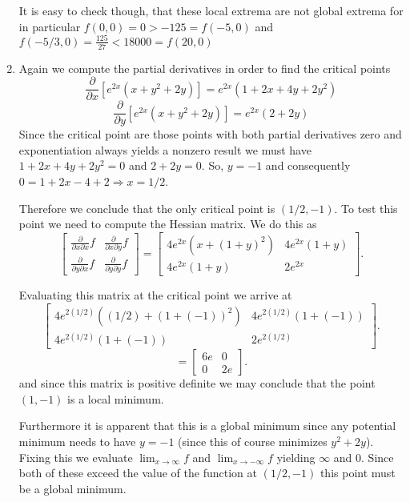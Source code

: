 \documentclass[12pt]{article}
\begin{document}
\begin{enumerate}
It is easy to check though, that these local extrema are not global extrema for in particular $f(0,0)=0>-125=f(-5,0)$ and $f(-5/3,0)=\frac{125}{27}<18000=f(20,0)$

\item Again we compute the partial derivatives in order to find the critical points
\[\frac{\partial}{\partial x} \left[ e^{2x}(x+y^2+2y) \right]=e^{2 x} \left(1+2 x+4 y+2 y^2\right)\]
\[\frac{\partial}{\partial y} \left[ e^{2x}(x+y^2+2y) \right] =e^{2 x} (2+2 y)\]
Since the critical point are those points with both partial derivatives zero and exponentiation always yields a nonzero result we must have $1+2x+4y+2y^2=0$ and $2+2y=0$. So, $y=-1$ and consequently $0=1+2x-4+2\Rightarrow x=1/2$.

Therefore we conclude that the only critical point is $(1/2,-1)$. To test this point we need to compute the Hessian matrix. We do this as
\[
\left[
\begin{array}{lr}
\frac{\partial}{\partial x \partial x} f&\frac{\partial}{\partial x \partial y} f\\
\frac{\partial}{\partial y \partial x} f&\frac{\partial}{\partial y \partial y} f
\end{array}\right]
=
\left[
\begin{array}{lr}
4 e^{2 x} \left(x+(1+y)^2\right) & 4 e^{2 x} (1+y)\\
4 e^{2 x} (1+y) & 2 e^{2 x}
\end{array}\right].
\]

Evaluating this matrix at the critical point we arrive at 
\[
\left[
\begin{array}{lr}
4 e^{2 (1/2)} \left((1/2)+(1+(-1))^2\right) & 4 e^{2 (1/2)} (1+(-1))\\
4 e^{2 (1/2)} (1+(-1)) & 2 e^{2(1/2)}
\end{array}\right].
\]
\[
=
\left[
\begin{array}{lr}
6 e & 0\\
0& 2 e
\end{array}\right].
\]
and since this matrix is positive definite we may conclude that the point $(1,-1)$ is a local minimum.


Furthermore it is apparent that this is a global minimum since any potential minimum needs to have $y=-1$ (since this of course minimizes $y^2+2y$). Fixing this we evaluate $\lim_{x \to \infty} f$ and $\lim_{x \to -\infty} f$ yielding $\infty$ and $0$. Since both of these exceed the value of the function at $(1/2,-1)$ this point must be a global minimum.


\end{enumerate}
\end{document}
